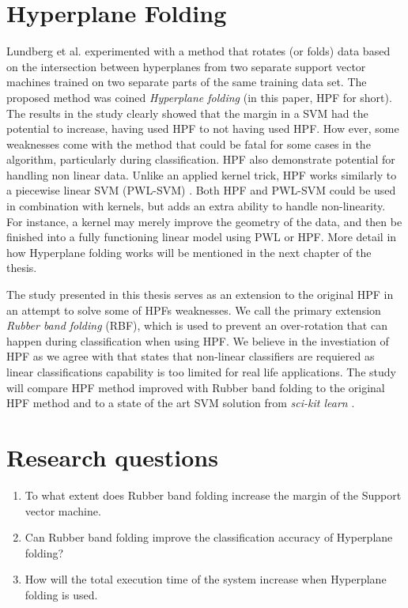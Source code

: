 \documentclass[a4paper,twoside]{bth}
\begin{document}
\section{Hyperplane Folding}
Lundberg et al. \cite{unpublished} experimented with a method that rotates (or folds) data based on the intersection between hyperplanes from two separate support vector machines trained on two separate parts of the same training data set. The proposed method was coined \textit{Hyperplane folding} (in this paper, HPF for short). The results in the study clearly showed that the margin in a SVM had the potential to increase, having used HPF to not having used HPF. How ever, some weaknesses come with the method that could be fatal for some cases in the algorithm, particularly during classification. HPF also demonstrate potential for handling non linear data. Unlike an applied kernel trick, HPF works similarly to a piecewise linear SVM (PWL-SVM) \cite{PWLSVM}. Both HPF and PWL-SVM could be used in combination with kernels, but adds an extra ability to handle non-linearity. For instance, a kernel may merely improve the geometry of the data, and then be finished into a fully functioning linear model using PWL or HPF. More detail in how Hyperplane folding works will be mentioned in the next chapter of the thesis. 

\par The study presented in this thesis serves as an extension to the original HPF in an attempt to solve some of HPFs weaknesses. We call the primary extension \textit{Rubber band folding} (RBF), which is used to prevent an over-rotation that can happen during classification when using HPF. We believe in the investiation of HPF as we agree with \cite{PWLSVM} that states that non-linear classifiers are requiered as linear classifications capability is too limited for real life applications. The study will compare HPF method improved with Rubber band folding to the original HPF method and to a state of the art SVM solution from \textit{sci-kit learn} \cite{scikit-learn}.

\section{Research questions}

\begin{enumerate}
  \item To what extent does Rubber band folding increase the margin of the Support vector machine.
  \item Can Rubber band folding improve the classification accuracy of Hyperplane folding? 
  \item How will the total execution time of the system increase when Hyperplane folding is used.
\end{enumerate}
\end{document}
